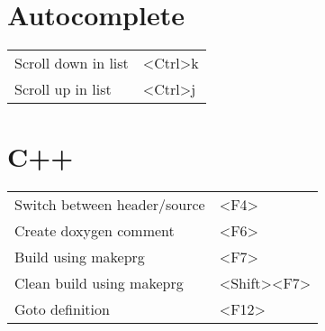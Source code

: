 \documentclass[a4paper]{report}
\def \tablewidth {9cm}
\begin{document}
\section{Autocomplete}
\begin{tabularx}{\tablewidth}{| X | l |}
  \hline
  Scroll down in list & \textless Ctrl\textgreater k \\
  Scroll up in list & \textless Ctrl\textgreater j \\
  \hline
\end{tabularx}

\section{C++}
\begin{tabularx}{\tablewidth}{| X | l |}
  \hline
  Switch between header/source & \textless F4\textgreater \\
  Create doxygen comment & \textless F6\textgreater \\
  Build using makeprg & \textless F7\textgreater \\
  Clean build using makeprg & \textless Shift\textgreater \textless F7\textgreater \\
  Goto definition & \textless F12\textgreater \\
  \hline
\end{tabularx}
\end{document}
